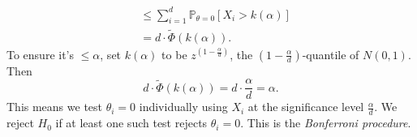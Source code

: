 \documentclass[a4paper]{article}
\begin{document}
\begin{eg}
\begin{answer}
\begin{equation*}
\begin{aligned}
				&\leq \sum\limits_{i=1}^d \mathbb{P}_{\theta = 0}[X_i > k(\alpha)] \\
				&= d \cdot \tilde{\Phi}(k(\alpha)).
			\end{aligned}
		\end{equation*}
		To ensure it's $\leq \alpha$, set $k(\alpha)$ to be $z^{(1-\frac{\alpha}{d})}$, the $(1-\frac{\alpha}{d})$-quantile of $N(0,1)$. Then
		\begin{equation*}
			d \cdot \tilde{\Phi}(k(\alpha)) = d \cdot \frac{\alpha}{d} = \alpha.
		\end{equation*}
		This means we test $\theta_i = 0$ individually using $X_i$ at the significance level $\frac{\alpha}{d}$. We reject $H_0$ if at least one such test rejects $\theta_i = 0$. This is the \emph{Bonferroni procedure}.
	\end{answer}
\end{eg}
\end{document}

